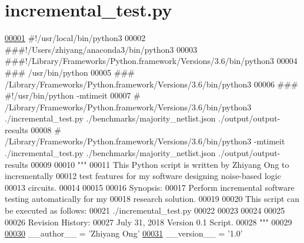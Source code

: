 \hypertarget{incremental__test_8py_source}{}\section{incremental\+\_\+test.\+py}

\begin{DoxyCode}
\hypertarget{incremental__test_8py_source_l00001}{}\hyperlink{namespaceincremental__test}{00001} \textcolor{comment}{#!/usr/local/bin/python3}
00002 \textcolor{comment}{###!/Users/zhiyang/anaconda3/bin/python3 }
00003 \textcolor{comment}{###!/Library/Frameworks/Python.framework/Versions/3.6/bin/python3}
00004 \textcolor{comment}{### /usr/bin/python}
00005 \textcolor{comment}{### /Library/Frameworks/Python.framework/Versions/3.6/bin/python3}
00006 \textcolor{comment}{### #!/usr/bin/python -mtimeit}
00007 \textcolor{comment}{#   /Library/Frameworks/Python.framework/Versions/3.6/bin/python3 ./incremental\_test.py
       ./benchmarks/majority\_netlist.json  ./output/output-results}
00008 \textcolor{comment}{#   /Library/Frameworks/Python.framework/Versions/3.6/bin/python3 -mtimeit ./incremental\_test.py
       ./benchmarks/majority\_netlist.json ./output/output-results}
00009 
00010 \textcolor{stringliteral}{"""}
00011 \textcolor{stringliteral}{    This Python script is written by Zhiyang Ong to incrementally}
00012 \textcolor{stringliteral}{        test features for my software designing noise-based logic}
00013 \textcolor{stringliteral}{        circuits.}
00014 \textcolor{stringliteral}{}
00015 \textcolor{stringliteral}{}
00016 \textcolor{stringliteral}{    Synopsis:}
00017 \textcolor{stringliteral}{    Perform incremental software testing automatically for my}
00018 \textcolor{stringliteral}{        research solution.}
00019 \textcolor{stringliteral}{}
00020 \textcolor{stringliteral}{    This script can be executed as follows:}
00021 \textcolor{stringliteral}{    ./incremental\_test.py}
00022 \textcolor{stringliteral}{}
00023 \textcolor{stringliteral}{}
00024 \textcolor{stringliteral}{}
00025 \textcolor{stringliteral}{}
00026 \textcolor{stringliteral}{    Revision History:}
00027 \textcolor{stringliteral}{    July 31, 2018           Version 0.1 Script.}
00028 \textcolor{stringliteral}{"""}
00029 
\hypertarget{incremental__test_8py_source_l00030}{}\hyperlink{namespaceincremental__test_a5f6427d0e520c9febabce9161afb249b}{00030} \_\_author\_\_ = \textcolor{stringliteral}{'Zhiyang Ong'}
\hypertarget{incremental__test_8py_source_l00031}{}\hyperlink{namespaceincremental__test_a0f94dd1f320b9558e27a5809d2041c4c}{00031} \_\_version\_\_ = \textcolor{stringliteral}{'1.0'}

\end{DoxyCode}
